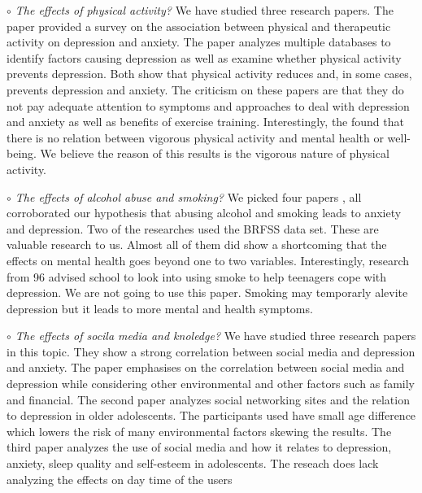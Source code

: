 \documentclass[letterpaper, 10 pt, conference]{ieeeconf}  %
\begin{document}
\par\noindent\textit{$\circ$ The effects of physical activity?}\newline
We have studied three research papers.  
The \cite{strohle2009physical} paper provided a survey on the association 
between physical and therapeutic activity on depression and anxiety. 
The \cite{mammen2013physical} paper analyzes multiple databases to identify factors causing depression as 
well as examine whether physical activity prevents depression. Both show that
physical activity reduces and, in some cases, prevents depression and anxiety. 
The criticism on these papers are that they do not pay adequate attention to symptoms 
and approaches to deal with depression and anxiety as well as benefits of exercise training.
Interestingly, the \cite{van2013exploratory} found that there is no 
relation between vigorous physical activity and mental health or well-being. We believe 
the reason of this results is the vigorous nature of physical activity. 

\setlength{\parskip}{1em} %

\par\noindent\textit{$\circ$ The effects of alcohol abuse and smoking?}\newline
We picked four papers \cite{jia2018associations}\cite{strine2008depression}\cite{allan2015effects}\cite{patton1996smoking}
, all corroborated our hypothesis that abusing alcohol and smoking leads to anxiety and depression. Two of the 
researches used the BRFSS data set. These are valuable research to us. Almost all of them did show a shortcoming that 
the effects on mental health goes beyond one to two variables. Interestingly, research \cite{patton1996smoking}  
from 96 advised school to look into using smoke to help teenagers cope with depression. We are not going to use this paper. 
Smoking may temporarly alevite depression but it leads to more mental and health symptoms. 


\par\noindent\textit{$\circ$ The effects of socila media and knoledge?}\newline
We have studied three research papers in this topic. They show a strong correlation between 
social media and depression and anxiety. The paper \cite{lin2016association} emphasises on the correlation 
between social media and depression while considering other environmental and other factors such as family and financial. 
The second paper \cite{jelenchick2013facebook} analyzes social networking sites and the relation to depression in older 
adolescents. The participants used have small age difference which lowers the risk of many 
environmental factors skewing the results. The third paper \cite{woods2016sleepyteens} analyzes the use of social media 
and how it relates to depression, anxiety, sleep quality and self-esteem in adolescents. The reseach does 
lack analyzing the effects on day time of the users 
\end{document}
